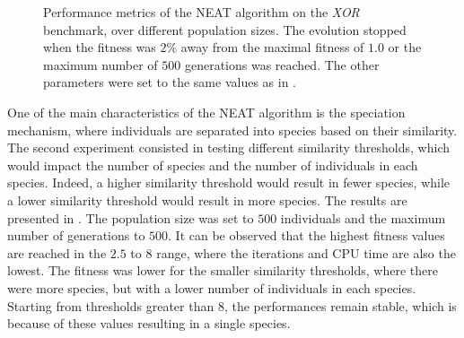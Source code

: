 \begin{figure}
\begin{center}
    \end{center}
    \caption{Performance metrics of the NEAT algorithm on the \textit{XOR} benchmark, over different population sizes.
    The evolution stopped when the fitness was $2\%$ away from the maximal fitness of $1.0$ or the maximum number of $500$ generations was reached.
    The other parameters were set to the same values as in \cite{neat}.}
    \label{fig:neat_xor}
\end{figure}

One of the main characteristics of the NEAT algorithm is the speciation mechanism, where individuals are separated into species based on their similarity. The second experiment consisted in testing different
similarity thresholds, which would impact the number of species and the number of individuals in each species. Indeed, a higher similarity threshold would result in fewer species, while a lower similarity threshold
would result in more species. The results are presented in . The population size was set to $500$ individuals and the maximum number of generations to $500$. It can be observed that
the highest fitness values are reached in the $2.5$ to $8$ range, where the iterations and CPU time are also the lowest. The fitness was lower for the smaller similarity thresholds, where there were more
species, but with a lower number of individuals in each species. Starting from thresholds greater than $8$, the performances remain stable, which is because of these values resulting in a single species.

